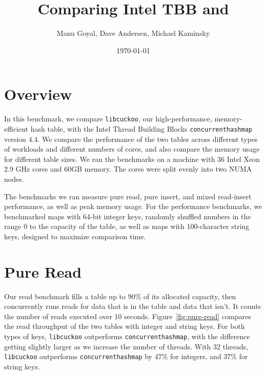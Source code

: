 \documentclass{article}
\title{Comparing Intel TBB {\tbbmap} and \libcuckoo}
\author{Manu Goyal, Dave Andersen, Michael Kaminsky}
\date{\today}
\newcommand{\tbbmap}{\texttt{concurrent\textunderscore hash\textunderscore map}}
\newcommand{\libcuckoo}{\texttt{libcuckoo}}
\begin{document}
\maketitle{}

\section*{Overview}

In this benchmark, we compare {\libcuckoo}, our high-performance,
memory-efficient hash table, with the Intel Thread Building Blocks {\tbbmap}
version 4.4. We compare the performance of the two tables across different types
of workloads and different numbers of cores, and also compare the memory usage
for different table sizes. We ran the benchmarks on a machine with 36 Intel Xeon
2.9 GHz cores and 60GB memory. The cores were split evenly into two NUMA nodes.

The benchmarks we ran measure pure read, pure insert, and mixed read-insert
performance, as well as peak memory usage. For the performance benchmarks, we
benchmarked maps with 64-bit integer keys, randomly shuffled numbers in the
range 0 to the capacity of the table, as well as maps with 100-character string
keys, designed to maximize comparison time.

\section*{Pure Read}
Our read benchmark fills a table up to 90\% of its allocated capacity, then
concurrently runs reads for data that is in the table and data that isn't. It
counts the number of reads executed over 10 seconds. Figure~\ref{fig:pure-read}
compares the read throughput of the two tables with integer and string keys. For
both types of keys, {\libcuckoo} outperforms {\tbbmap}, with the difference
getting slightly larger as we increase the number of threads. With 32 threads,
{\libcuckoo} outperforms {\tbbmap} by 47\% for integers, and 37\% for string
keys.
\end{document}

